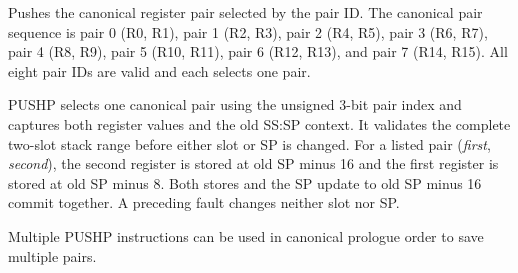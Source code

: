 Pushes the canonical register pair selected by the pair ID. The canonical pair sequence is pair 0 (R0, R1), pair 1 (R2, R3), pair 2 (R4, R5), pair 3 (R6, R7), pair 4 (R8, R9), pair 5 (R10, R11), pair 6 (R12, R13), and pair 7 (R14, R15). All eight pair IDs are valid and each selects one pair.

PUSHP selects one canonical pair using the unsigned 3-bit pair index and captures both register values and the old
SS:SP context. It validates the complete two-slot stack range before either slot or SP is changed. For a listed pair
(\emph{first}, \emph{second}), the second register is stored at old SP minus 16 and the first register is stored at
old SP minus 8. Both stores and the SP update to old SP minus 16 commit together. A preceding fault changes neither
slot nor SP.

Multiple PUSHP instructions can be used in canonical prologue order to save multiple pairs.
